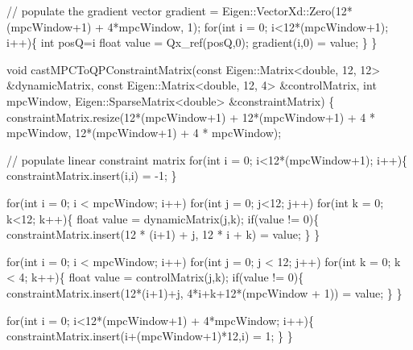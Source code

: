 \begin{DoxyCodeInclude}
    \textcolor{comment}{// populate the gradient vector}
    gradient = Eigen::VectorXd::Zero(12*(mpcWindow+1) +  4*mpcWindow, 1);
    \textcolor{keywordflow}{for}(\textcolor{keywordtype}{int} i = 0; i<12*(mpcWindow+1); i++)\{
        \textcolor{keywordtype}{int} posQ=i%
        \textcolor{keywordtype}{float} value = Qx\_ref(posQ,0);
        gradient(i,0) = value;
    \}
\}

\textcolor{keywordtype}{void} castMPCToQPConstraintMatrix(\textcolor{keyword}{const} Eigen::Matrix<double, 12, 12> &dynamicMatrix, \textcolor{keyword}{const} 
      Eigen::Matrix<double, 12, 4> &controlMatrix,
                                 \textcolor{keywordtype}{int} mpcWindow, Eigen::SparseMatrix<double> &constraintMatrix)
\{
    constraintMatrix.resize(12*(mpcWindow+1)  + 12*(mpcWindow+1) + 4 * mpcWindow, 12*(mpcWindow+1) + 4 * 
      mpcWindow);

    \textcolor{comment}{// populate linear constraint matrix}
    \textcolor{keywordflow}{for}(\textcolor{keywordtype}{int} i = 0; i<12*(mpcWindow+1); i++)\{
        constraintMatrix.insert(i,i) = -1;
    \}

    \textcolor{keywordflow}{for}(\textcolor{keywordtype}{int} i = 0; i < mpcWindow; i++)
        \textcolor{keywordflow}{for}(\textcolor{keywordtype}{int} j = 0; j<12; j++)
            \textcolor{keywordflow}{for}(\textcolor{keywordtype}{int} k = 0; k<12; k++)\{
                \textcolor{keywordtype}{float} value = dynamicMatrix(j,k);
                \textcolor{keywordflow}{if}(value != 0)\{
                    constraintMatrix.insert(12 * (i+1) + j, 12 * i + k) = value;
                \}
            \}

    \textcolor{keywordflow}{for}(\textcolor{keywordtype}{int} i = 0; i < mpcWindow; i++)
        \textcolor{keywordflow}{for}(\textcolor{keywordtype}{int} j = 0; j < 12; j++)
            \textcolor{keywordflow}{for}(\textcolor{keywordtype}{int} k = 0; k < 4; k++)\{
                \textcolor{keywordtype}{float} value = controlMatrix(j,k);
                \textcolor{keywordflow}{if}(value != 0)\{
                    constraintMatrix.insert(12*(i+1)+j, 4*i+k+12*(mpcWindow + 1)) = value;
                \}
            \}

    \textcolor{keywordflow}{for}(\textcolor{keywordtype}{int} i = 0; i<12*(mpcWindow+1) + 4*mpcWindow; i++)\{
        constraintMatrix.insert(i+(mpcWindow+1)*12,i) = 1;
    \}
\}


\end{DoxyCodeInclude}
